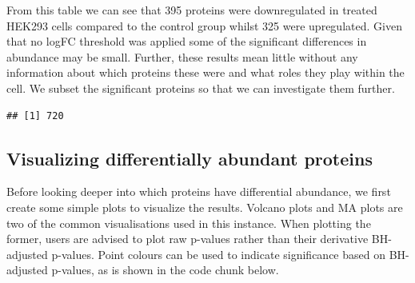 \documentclass[9pt,a4paper,]{extarticle}
\newenvironment{Shaded}{\begin{snugshade}}{\end{snugshade}}
\newcommand{\DocumentationTok}[1]{\textcolor[rgb]{0.56,0.35,0.01}{\textbf{\textit{#1}}}}
\newcommand{\FloatTok}[1]{\textcolor[rgb]{0.00,0.00,0.81}{#1}}
\newcommand{\FunctionTok}[1]{\textcolor[rgb]{0.00,0.00,0.00}{#1}}
\newcommand{\NormalTok}[1]{#1}
\newcommand{\OtherTok}[1]{\textcolor[rgb]{0.56,0.35,0.01}{#1}}
\newcommand{\SpecialCharTok}[1]{\textcolor[rgb]{0.00,0.00,0.00}{#1}}
\begin{document}
From this table we can see that 395 proteins were downregulated
in treated HEK293 cells compared to the control group whilst 325
were upregulated. Given that no logFC threshold was applied some of the significant
differences in abundance may be small. Further, these results mean little without
any information about which proteins these were and what roles they play within
the cell. We subset the significant proteins so that we can investigate them
further.

\begin{Shaded}
\end{Shaded}

\begin{verbatim}
## [1] 720
\end{verbatim}

\hypertarget{visualizing-differentially-abundant-proteins}{%
\subsection{Visualizing differentially abundant proteins}\label{visualizing-differentially-abundant-proteins}}

Before looking deeper into which proteins have differential abundance, we first
create some simple plots to visualize the results. Volcano plots and MA plots
are two of the common visualisations used in this instance. When plotting the
former, users are advised to plot raw p-values rather than their derivative
BH-adjusted p-values. Point colours can be used to indicate significance based
on BH- adjusted p-values, as is shown in the code chunk below.
\end{document}
